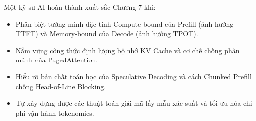 \begin{checkpointbox}
Một kỹ sư AI hoàn thành xuất sắc Chương 7 khi:
\begin{itemize}
  \item Phân biệt tường minh đặc tính Compute-bound của Prefill (ảnh hưởng TTFT) và Memory-bound của Decode (ảnh hưởng TPOT).
  \item Nắm vững công thức định lượng bộ nhớ KV Cache và cơ chế chống phân mảnh của PagedAttention.
  \item Hiểu rõ bản chất toán học của Speculative Decoding và cách Chunked Prefill chống Head-of-Line Blocking.
  \item Tự xây dựng được các thuật toán giải mã lấy mẫu xác suất và tối ưu hóa chi phí vận hành tokenomics.
\end{itemize}
\end{checkpointbox}
